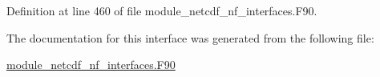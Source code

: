 Definition at line 460 of file module\+\_\+netcdf\+\_\+nf\+\_\+interfaces.\+F90.



The documentation for this interface was generated from the following file\+:\begin{DoxyCompactItemize}
\item 
\hyperlink{module__netcdf__nf__interfaces_8F90}{module\+\_\+netcdf\+\_\+nf\+\_\+interfaces.\+F90}\end{DoxyCompactItemize}
